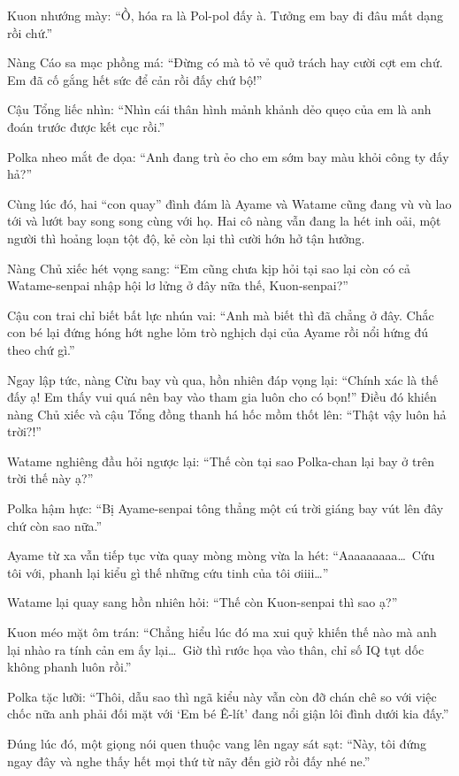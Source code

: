 \documentclass[../main.tex]{subfiles}
\begin{document}
Kuon nhướng mày: ``Ồ, hóa ra là Pol-pol đấy à. Tưởng em bay đi đâu mất dạng rồi chứ.''

Nàng Cáo sa mạc phồng má: ``Đừng có mà tỏ vẻ quở trách hay cười cợt em chứ. Em đã cố gắng hết sức để cản rồi đấy chứ bộ!''

Cậu Tổng liếc nhìn: ``Nhìn cái thân hình mảnh khảnh dẻo quẹo của em là anh đoán trước được kết cục rồi.''

Polka nheo mắt đe dọa: ``Anh đang trù ẻo cho em sớm bay màu khỏi công ty đấy hả?''

Cùng lúc đó, hai ``con quay'' đình đám là Ayame và Watame cũng đang vù vù lao tới và lướt bay song song cùng với họ. Hai cô nàng vẫn đang la hét inh oải, một người thì hoảng loạn tột độ, kẻ còn lại thì cười hớn hở tận hưởng.

Nàng Chủ xiếc hét vọng sang: ``Em cũng chưa kịp hỏi tại sao lại còn có cả Watame-senpai nhập hội lơ lửng ở đây nữa thế, Kuon-senpai?''

Cậu con trai chỉ biết bất lực nhún vai: ``Anh mà biết thì đã chẳng ở đây. Chắc con bé lại đứng hóng hớt nghe lỏm trò nghịch dại của Ayame rồi nổi hứng đú theo chứ gì.''

Ngay lập tức, nàng Cừu bay vù qua, hồn nhiên đáp vọng lại: ``Chính xác là thế đấy ạ! Em thấy vui quá nên bay vào tham gia luôn cho có bọn!'' Điều đó khiến nàng Chủ xiếc và cậu Tổng đồng thanh há hốc mồm thốt lên: ``Thật vậy luôn hả trời?!''

Watame nghiêng đầu hỏi ngược lại: ``Thế còn tại sao Polka-chan lại bay ở trên trời thế này ạ?''

Polka hậm hực: ``Bị Ayame-senpai tông thẳng một cú trời giáng bay vút lên đây chứ còn sao nữa.''

Ayame từ xa vẫn tiếp tục vừa quay mòng mòng vừa la hét: ``Aaaaaaaaa\dots\ Cứu tôi với, phanh lại kiểu gì thế những cứu tinh của tôi ơiiii\dots''

Watame lại quay sang hồn nhiên hỏi: ``Thế còn Kuon-senpai thì sao ạ?''

Kuon méo mặt ôm trán: ``Chẳng hiểu lúc đó ma xui quỷ khiến thế nào mà anh lại nhào ra tính cản em ấy lại\dots\ Giờ thì rước họa vào thân, chỉ số IQ tụt dốc không phanh luôn rồi.''

Polka tặc lưỡi: ``Thôi, dẫu sao thì ngã kiểu này vẫn còn đỡ chán chê so với việc chốc nữa anh phải đối mặt với `Em bé Ê-lít' đang nổi giận lôi đình dưới kia đấy.''

Đúng lúc đó, một giọng nói quen thuộc vang lên ngay sát sạt: ``Này, tôi đứng ngay đây và nghe thấy hết mọi thứ từ nãy đến giờ rồi đấy nhé ne.''
\end{document}
